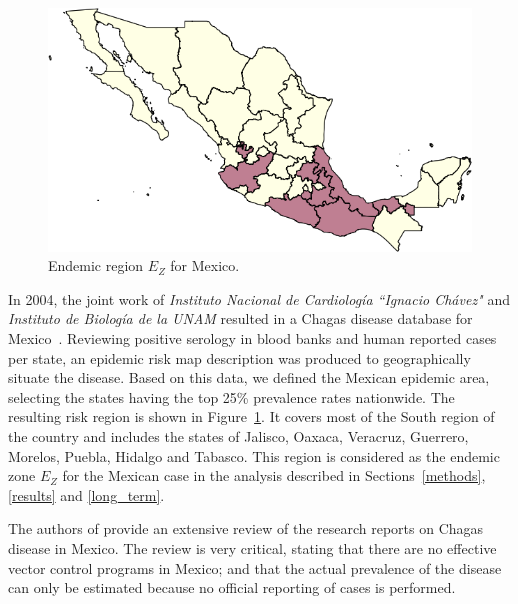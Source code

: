 \begin{figure}[h!]
\centering
\includegraphics[width=0.75\linewidth]
{figures/Ambientes_Gran_Chaco-Mexico1/Ambientes_Gran_Chaco-Mexico1}
\caption{Endemic region $E_Z$ for Mexico.}
\label{fig:endemic_zone_mexico}
\end{figure}

In 2004, the joint work of \textit{Instituto Nacional de Cardiología ``Ignacio Chávez"} and  \textit{Instituto de Biología de la UNAM} resulted in a Chagas disease database for Mexico~\cite{cruz2006chagmex}. Reviewing positive serology in blood banks and human reported cases per state, an epidemic risk map description was produced to geographically situate the disease. Based on this data, we defined the Mexican epidemic area, selecting the states having the top 25\% prevalence rates nationwide. The resulting risk region is shown in Figure~\ref{fig:endemic_zone_mexico}. It covers most of the South region of the country and includes the states of Jalisco, Oaxaca, Veracruz, Guerrero, Morelos, Puebla, Hidalgo and Tabasco.
This region is considered as the endemic zone $E_Z$ for the Mexican case in the analysis described in Sections~\ref{methods}, \ref{results} and \ref{long_term}.




The authors of \cite{carabarin2013chagas} provide an extensive review of the 
research reports on Chagas disease in Mexico.
The review is very critical, stating that there are no effective vector control programs in Mexico;
and that the actual prevalence of the disease 
can only be estimated because no official reporting of cases is performed.

